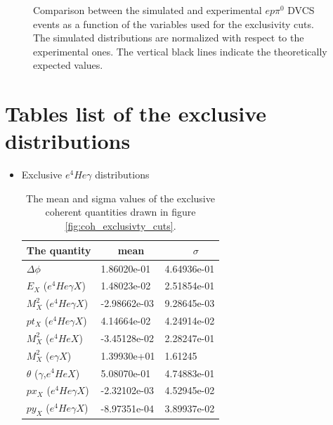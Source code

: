 \begin{figure}[h!]
\caption{Comparison between the simulated and experimental $ep\pi^{0}$ DVCS events as a function of the variables used for the exclusivity cuts. The simulated distributions are normalized with respect to the experimental ones. The vertical black lines indicate the theoretically expected values.} 
\label{fig:incoh_comparison_with_simulation_exclusive}
\end{figure}


\chapter{Tables list of the exclusive distributions}\label{exclusivity_cuts}
\begin{itemize}

\item Exclusive $e^{4}He\gamma$ distributions
\begin {table}[!h]
\begin{center}
\begin{tabular}{|l|l|l|}
\hline
The quantity &  ~~~mean & ~~~~~$\sigma$ \\
\hline
$\Delta \phi$ &  1.86020e-01 & 4.64936e-01 \\
\hline
$E_{X}$ ($e^{4}He\gamma X$) &  1.48023e-02 & 2.51854e-01 \\ 
\hline
$M^{2}_{X}$ ($e^{4}He\gamma X$) &  -2.98662e-03 & 9.28645e-03 \\ 
\hline
$pt_{X}$ ($e^{4}He\gamma X$) & 4.14664e-02 & 4.24914e-02 \\ 
\hline
$M^{2}_{X}$ ($e^{4}HeX$) & -3.45128e-02 & 2.28247e-01 \\
\hline
$M^{2}_{X}$ ($e\gamma X$) & 1.39930e+01 & 1.61245 \\
\hline
$\theta$ ($\gamma$,$e^{4}HeX$) &  5.08070e-01 & 4.74883e-01\\
\hline
$px_{X}$ ($e^{4}He\gamma X$) & -2.32102e-03  & 4.52945e-02\\
\hline
$py_{X}$ ($e^{4}He\gamma X$) &  -8.97351e-04 & 3.89937e-02\\ 
\hline
\end{tabular}
\caption{ The mean and sigma values of the exclusive coherent quantities drawn in figure \ref{fig:coh_exclusivty_cuts}.}
\label{Table:coh_exclusivity_cuts}
\end{center}
\end{table}



\end{itemize}
